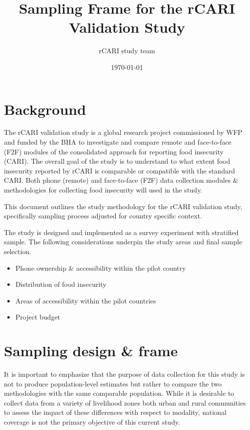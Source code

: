 \documentclass[11pt,harvard]{article}
\author{rCARI study team}
\date{\today}
\title{Sampling Frame for the rCARI Validation Study}
\begin{document}
	\maketitle \vspace{-2cm}
	\onehalfspacing
	\pagebreak
	\setlength{\parskip}{8pt} %
	
\section{Background}

The rCARI validation study is a global research project commissioned by WFP and funded by the BHA to investigate and compare remote and face-to-face (F2F) modules of the consolidated approach for reporting food insecurity (CARI). 
The overall goal of the study is to understand to what extent food insecurity reported by rCARI is comparable or compatible with the standard CARI. Both phone (remote) and face-to-face (F2F) data collection modules \& methodologies for collecting food insecurity will used in the study. 

This document outlines the study methodology for the rCARI validation study, specifically sampling process adjusted for country specific context.

The study is designed and implemented as a survey experiment with stratified sample. The following considerations underpin the study areas and final sample selection.

\begin{itemize}[left=2.0em]
	\item Phone ownership \& accessibility within the pilot country
	\item Distribution of food insecurity
	\item Areas of accessibility within the pilot countries
	\item Project budget
\end{itemize}  

\section{Sampling design \& frame}

It is important to emphasize that the purpose of data collection for this study is not to produce population-level estimates but rather to compare the two methodologies with the same comparable population. While it is desirable to collect data from a variety of livelihood zones both urban and rural communities to assess the impact of these differences with respect to modality, national coverage is not the primary objective of this current study. 
\end{document}
